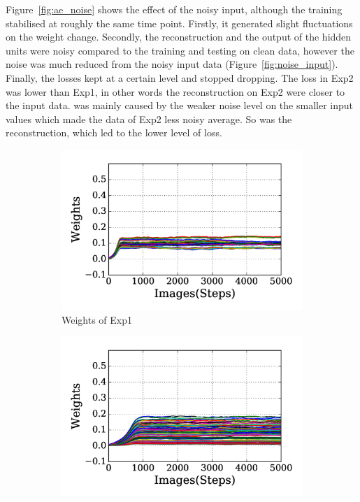 Figure~\ref{fig:ae_noise} shows the effect of the noisy input, although the training stabilised at roughly the same time point.
Firstly, it generated slight fluctuations on the weight change.
Secondly, the reconstruction and the output of the hidden units were noisy compared to the training and testing on clean data, however the noise was much reduced from the noisy input data (Figure~\ref{fig:noise_input}). 
Finally, the losses kept at a certain level and stopped dropping.
The loss in Exp2 was lower than Exp1, in other words the reconstruction on Exp2 were closer to the input data.
\protect{}
\protect{} was mainly caused by the weaker noise level on the smaller input values which made the data of Exp2 less noisy \protect{} \protect{} average.
So was the reconstruction, which led to the lower level of loss.
\begin{figure}
	\centering
	\begin{subfigure}[t]{0.45\textwidth}
		\includegraphics[width=\textwidth]{pics_sdlm/30_exp_RBM/exp1_weights_non.png}
		\caption{Weights of Exp1}
	\end{subfigure}
	\begin{subfigure}[t]{0.45\textwidth}
		\includegraphics[width=\textwidth]{pics_sdlm/30_exp_RBM/exp2_weights_non.png}

\end{subfigure}
\end{figure}
